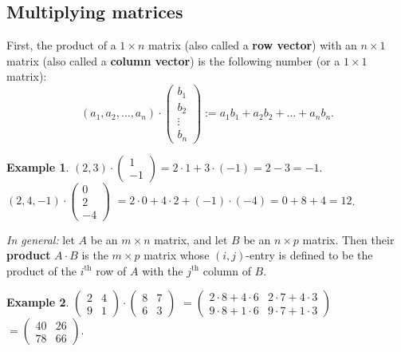 \documentclass[
  english,
  12pt,
  oneside]{book}
\theoremstyle{definition}
\theoremstyle{definition}
\newtheorem{example}{Example}[chapter]
\theoremstyle{definition}
\theoremstyle{definition}
\theoremstyle{remark}
\begin{document}
\subsection{Multiplying matrices}\label{multiplying-matrices}

First, the product of a \(1\times n\) matrix (also called a \textbf{row vector}) with an \(n\times 1\) matrix (also called a \textbf{column vector}) is the following number (or a \(1\times 1\) matrix):
\[(a_1,a_2,\dots,a_n)\cdot\begin{pmatrix}b_1\\b_2\\\vdots\\b_n\end{pmatrix} := a_1b_1 + a_2b_2 + \dots + a_nb_n.\]

\begin{example}
\protect\hypertarget{exm:unnamed-chunk-45}{}\label{exm:unnamed-chunk-45}\((2,3)\cdot\begin{pmatrix}1\\-1\end{pmatrix}=2\cdot1+3\cdot(-1)=2-3=-1\).\\
\((2,4,-1)\cdot \begin{pmatrix} 0\\ 2 \\ -4\end{pmatrix}\)
\(=2\cdot0+4\cdot2+(-1)\cdot(-4)=0+8+4=12\).
\end{example}

\emph{In general:} let \(A\) be an \(m\times n\) matrix, and let \(B\) be an \(n\times p\) matrix. Then their \textbf{product} \(A\cdot B\) is the \(m\times p\) matrix whose \((i,j)\)-entry is defined to be the product of the \(i^\text{th}\) row of \(A\) with the \(j^\text{th}\) column of \(B\).

\begin{example}
\protect\hypertarget{exm:unnamed-chunk-46}{}\label{exm:unnamed-chunk-46}\(\begin{pmatrix}2&4\\9&1\end{pmatrix}\cdot
\begin{pmatrix}8&7\\6&3\end{pmatrix}\)
\(=\begin{pmatrix}2\cdot8+4\cdot6& 2\cdot7+4\cdot3 \\ 9\cdot8+1\cdot6& 9\cdot7+1\cdot3\end{pmatrix}\)
\(=\begin{pmatrix}40&26\\78&66\end{pmatrix}\).
\end{example}
\end{document}
